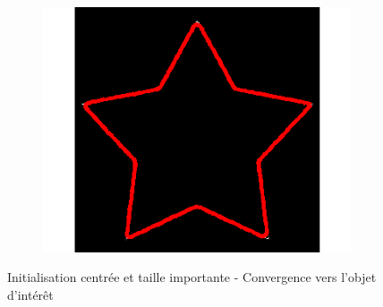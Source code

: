 \begin{figure}[H]
\begin{subfigure}[c]{0.3\linewidth}
\includegraphics[width=\textwidth]{Chapters/Images/Init/vfccl3}
\caption{}
\end{subfigure}
\caption{Initialisation centrée et taille importante - Convergence vers l'objet d'intérêt}
\end{figure}

